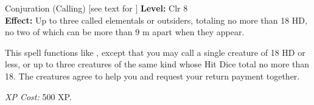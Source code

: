 {Conjuration (Calling) [see text for ]}
{
	\textbf{Level:}
	Clr 8\\
	\textbf{Effect:}
	Up to three called elementals or outsiders, totaling no more than 18 HD, no two of which can be more than 9 m apart when they appear.\\
}
{
	This spell functions like , except that you may call a single creature of 18 HD or less, or up to three creatures of the same kind whose Hit Dice total no more than 18. The creatures agree to help you and request your return payment together.

	\textit{XP Cost:}
	500 XP.

}
